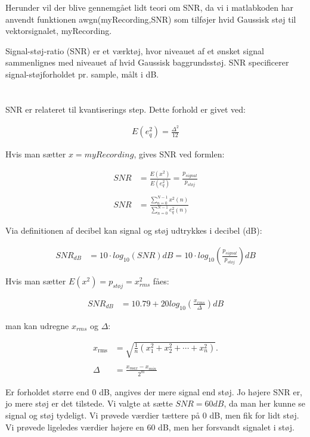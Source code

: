 \documentclass[a4paper]{report}
\begin{document}
Herunder vil der blive gennemgået lidt teori om SNR, da vi i matlabkoden har anvendt funktionen awgn(myRecording,SNR) som tilføjer hvid Gaussisk støj til vektorsignalet, myRecording. 

Signal-støj-ratio (SNR) er et værktøj, hvor niveauet af et ønsket signal sammenlignes med niveauet af hvid Gaussisk baggrundsstøj. SNR specificerer signal-støjforholdet pr. sample, målt i dB.\\
\\
\\

SNR er relateret til kvantiserings step. Dette forhold er givet ved: 

\begin{align}
E(e_q^2) = \frac{\Delta^2}{12}
\end{align}

Hvis man sætter $x=myRecording$, gives SNR ved formlen: 

\begin{align}
SNR &= \frac{E(x^2)}{E(e_q^2)}=\frac{p_{signal}}{p_{støj}}\\
\\
SNR &= \frac{\sum\limits_{n=0}^{N-1} x^2(n)}{\sum\limits_{n=0}^{N-1} e_{q}^2(n)}
\end{align}

Via definitionen af ​​decibel kan signal og støj udtrykkes i decibel (dB): 

\begin{align}
SNR_{dB} &= 10 \cdot log_{10}(SNR) dB = 10 \cdot log_{10}(\frac{p_{signal}}{p_{støj}})dB
\end{align}

Hvis man sætter $E(x^2)=p_{støj}= x^2_{rms}$ fåes: 


\begin{align}
SNR_{dB} &= 10.79 + 20log_{10}(\frac{x_{rms}}{\Delta}) dB
\end{align}

man kan udregne $x_{rms}$ og $\Delta:$

\begin{align}
x_{\mathrm{rms}} &= {\sqrt {{\frac {1}{n}}\left(x_{1}^{2}+x_{2}^{2}+\cdots +x_{n}^{2}\right)}}.\\
\\
\Delta &= \frac{x_{max}-x_{min}}{2^m}
\end{align}


Er forholdet større end 0 dB, angives der mere signal end støj. Jo højere SNR er, jo mere støj er det tilstede. Vi valgte at sætte $SNR=60 dB$, da man her kunne se signal og støj tydeligt. Vi prøvede værdier tættere på 0 dB, men fik for lidt støj. Vi prøvede ligeledes værdier højere en 60 dB, men her forsvandt signalet i støj.\\
\\  
\end{document}
